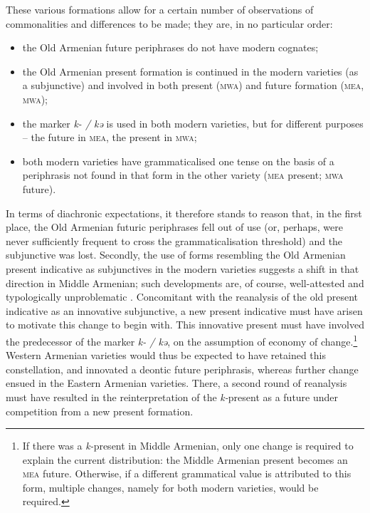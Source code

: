 \documentclass[output=paper,colorlinks,citecolor=brown]{langscibook}
\begin{document}
	These various formations allow for a certain number of observations of commonalities and differences to be made; they are, in no particular order:
	\begin{itemize}
		\item the Old Armenian future periphrases do not have modern cognates;
		\item the Old Armenian present formation is continued in the modern varieties (as a subjunctive) and involved in both present (\textsc{mwa}) and future formation (\textsc{mea}, \textsc{mwa});
		\item the marker \textit{k- / kə} is used in both modern varieties, but for different purposes – the future in \textsc{mea}, the present in \textsc{mwa};
		\item both modern varieties have grammaticalised one tense on the basis of a periphrasis not found in that form in the other variety (\textsc{mea} present; \textsc{mwa} future).
	\end{itemize}
	
	In terms of diachronic expectations, it therefore stands to reason that, in the first place, the Old Armenian futuric periphrases fell out of use (or, perhaps, were never sufficiently frequent to cross the grammaticalisation threshold) and the subjunctive was lost. Secondly, the use of forms resembling the Old Armenian present indicative as subjunctives in the modern varieties suggests a shift in that direction in Middle Armenian; such developments are, of course, well-attested and typologically unproblematic \citep[cf.][]{Haspelmath1998a}. Concomitant with the reanalysis of the old present indicative as an innovative subjunctive, a new present indicative must have arisen to motivate this change to begin with. This innovative present must have involved the predecessor of the marker \textit{k- / kə}, on the assumption of economy of change.\footnote{If there was a \textit{k-}present in Middle Armenian, only one change is required to explain the current distribution: the Middle Armenian present becomes an \textsc{mea} future. Otherwise, if a different grammatical value is attributed to this form, multiple changes, namely for both modern varieties, would be required.} Western Armenian varieties would thus be expected to have retained this constellation, and innovated a deontic future periphrasis, whereas further change ensued in the Eastern Armenian varieties. There, a second round of reanalysis must have resulted in the reinterpretation of the \textit{k-}present as a future under competition from a new present formation.
	
\end{document}
